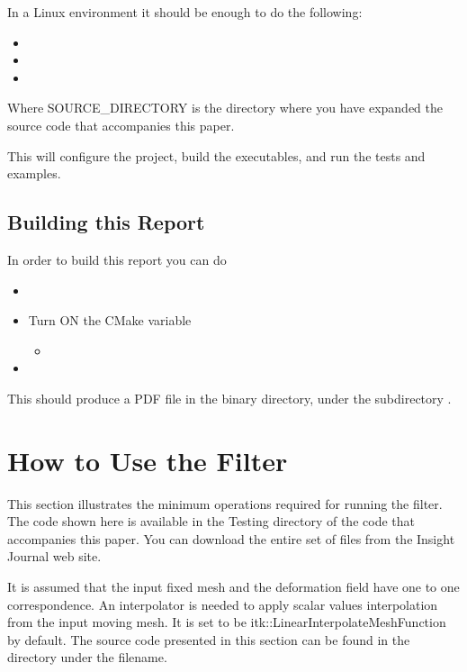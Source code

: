 \documentclass{InsightArticle}
\begin{document}
In a Linux environment it should be enough to do the following:

\begin{itemize}
\item {}
\item {}
\item {}
\end{itemize}

Where SOURCE\_DIRECTORY is the directory where you have expanded the source
code that accompanies this paper.

This will configure the project, build the executables, and run the tests and
examples. 


\subsection{Building this Report}

In order to build this report you can do

\begin{itemize}
\item {}
\item Turn ON the CMake variable
\begin{itemize}
\item {}
\end{itemize}
\item {}
\end{itemize}

This should produce a PDF file in the binary directory, under the subdirectory
.


\section{How to Use the Filter}

This section illustrates the minimum operations required for running the filter. The code shown here 
is available in the Testing directory of the code that accompanies this paper. You can download the 
entire set of files from the Insight Journal web site.

It is assumed that the input fixed mesh and the deformation field have one to one correspondence. 
An interpolator is needed to apply scalar values interpolation from the input moving mesh. 
It is set to be itk::LinearInterpolateMeshFunction~\cite{MeshRigidRegistrationIJ2009} by default. 
The source code presented in this section can be found in the  directory under the filename.
\end{document}
